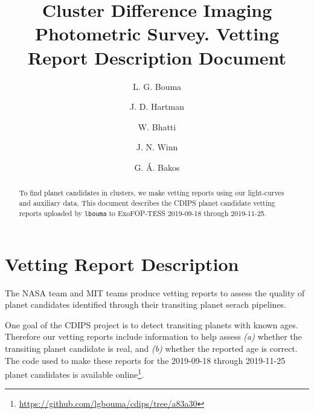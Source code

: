 \documentclass[12pt,twocolumn,tighten]{aastex62}
\begin{document}
\title{
  Cluster Difference Imaging Photometric Survey.
  Vetting Report Description Document
}


\author[0000-0002-0514-5538]{L. G. Bouma}
%
\author[0000-0001-8732-6166]{J. D. Hartman}
%
\author[0000-0002-0628-0088]{W. Bhatti}
%
\author[0000-0002-4265-047X]{J. N. Winn}
%
\author[0000-0001-7204-6727]{G. \'A. Bakos}

\begin{abstract}
To find planet candidates in clusters,
we make vetting reports using our light-curves \citep{bouma_cdips_2019} and
auxiliary data.
This document describes the CDIPS planet candidate vetting reports
uploaded by \texttt{lbouma} to ExoFOP-TESS 2019-09-18 through 2019-11-25.
\\

\end{abstract}


\section{Vetting Report Description}
\label{appendix:vetreport}

The NASA team and MIT teams \citep{jenkins_spoc_2010,huang_tess_2018}
produce vetting reports to assess the quality of planet candidates
identified through their transiting planet serach pipelines.

One goal of the CDIPS project is to detect transiting planets with
known ages.  Therefore our vetting reports include information to help
assess {\it (a)} whether the transiting planet candidate is real, and
{\it (b)} whether the reported age is correct.
The code used to make these reports for the 2019-09-18 through
2019-11-25 planet candidates is available online\footnote{ 
\url{https://github.com/lgbouma/cdips/tree/a83a30}}.
\end{document}
